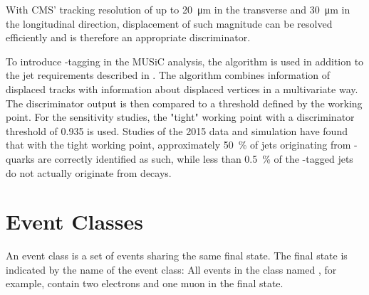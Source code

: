 With \ac{CMS}' tracking resolution of up to \SI{20}{\micro\meter} in the transverse and \SI{30}{\micro\meter} in the longitudinal direction\cite{CMS:CMS-PAS-BTV-15-001}, displacement of such magnitude can be resolved efficiently and is therefore an appropriate discriminator.

To introduce \Pqb-tagging in the \ac{MUSiC} analysis, the  algorithm\cite{CMSCollaboration:Identificationbquark} is used in addition to the jet requirements described in . The algorithm combines information of displaced tracks with information about displaced vertices in a multivariate way. The discriminator output is then compared to a threshold defined by the working point.
For the sensitivity studies, the "tight" working point with a discriminator threshold of \num{0.935} is used. Studies of the 2015 data and simulation have found that with the tight working point, approximately \SI{50}{\percent} of jets originating from \Pqb-quarks are correctly identified as such, while less than \SI{0.5}{\percent} of the \Pqb-tagged jets do not actually originate from \Pqb decays\cite{CMS:CMS-AN-2016-036}.



%
%
%
%
%
%
%


\section{Event Classes}
An event class is a set of events sharing the same final state. The final state is indicated by the name of the event class: All events in the class named \eventclass{2\Pe + 1\Pmu}, for example, contain two electrons and one muon in the final state.


